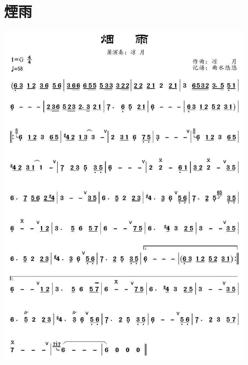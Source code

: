 \documentclass[cn,pad,twocol]{elegantbook}
\begin{document}
\section{煙雨}
    \includegraphics[width=0.95\textwidth]{dongxiao/20201231-烟雨}
\end{document}
